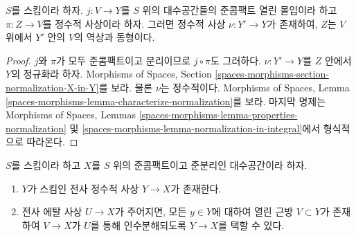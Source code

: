 \begin{lemma}
\label{lemma-extend-integral-morphism}
$S$를 스킴이라 하자. $j : V \to Y$를 $S$ 위의 대수공간들의
준콤팩트 열린 몰입이라 하고 $\pi : Z \to V$를 정수적 사상이라 하자.
그러면 정수적 사상 $\nu : Y' \to Y$가 존재하여, $Z$는 $V$ 위에서
$Y'$ 안의 $V$의 역상과 동형이다.
\end{lemma}

\begin{proof}
$j$와 $\pi$가 모두 준콤팩트이고 분리이므로 $j \circ \pi$도 그러하다.
$\nu : Y' \to Y$를 $Z$ 안에서 $Y$의 정규화라 하자. Morphisms of
Spaces, Section
\ref{spaces-morphisms-section-normalization-X-in-Y}를 보라.
물론 $\nu$는 정수적이다. Morphisms of Spaces, Lemma
\ref{spaces-morphisms-lemma-characterize-normalization}를 보라.
마지막 명제는 Morphisms of Spaces, Lemmas
\ref{spaces-morphisms-lemma-properties-normalization} 및
\ref{spaces-morphisms-lemma-normalization-in-integral}에서
형식적으로 따라온다.
\end{proof}

\begin{lemma}
\label{lemma-there-is-a-scheme-integral-over}
$S$를 스킴이라 하고 $X$를 $S$ 위의 준콤팩트이고 준분리인
대수공간이라 하자.
\begin{enumerate}
\item $Y$가 스킴인 전사 정수적 사상 $Y \to X$가 존재한다.
\item 전사 에탈 사상 $U \to X$가 주어지면, 모든 $y \in Y$에 대하여
열린 근방 $V \subset Y$가 존재하여 $V \to X$가 $U$를 통해
인수분해되도록 $Y \to X$를 택할 수 있다.
\end{enumerate}
\end{lemma}

